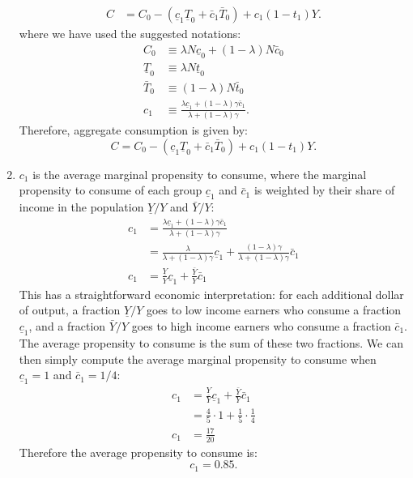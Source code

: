 \documentclass[]{book}
\begin{document}
\begin{enumerate}
\[\begin{aligned}
  C&=C_0 -\left(\underline{c}_{1}\underline{T}_0+\bar{c}_{1}\bar{T}_0\right)+c_1 (1-t_1) Y.
  \end{aligned}
  \] where we have used the suggested notations: \[
  \begin{aligned}
  C_{0}& \equiv \lambda  N \underline{c}_0 + (1-\lambda) N \bar{c}_0\\
  \underline{T}_{0}& \equiv \lambda  N \underline{t}_0\\
  \bar{T}_0 & \equiv (1-\lambda) N \bar{t}_0\\
  c_{1}&\equiv\frac{\lambda\underline{c}_{1}+\left(1-\lambda\right)\gamma\bar{c}_{1}}{\lambda+(1-\lambda)\gamma}.
  \end{aligned}
  \] Therefore, aggregate consumption is given by:
  \[\boxed{C=C_0 -\left(\underline{c}_{1}\underline{T}_0+\bar{c}_{1}\bar{T}_0\right)+c_1 (1-t_1) Y}.\]
\item
  \(c_1\) is the average marginal propensity to consume, where the
  marginal propensity to consume of each group \(\underline{c}_1\) and
  \(\bar{c}_1\) is weighted by their share of income in the population
  \(\underline{Y}/Y\) and \(\bar{Y}/Y\): \[
  \begin{aligned}
  c_1&=\frac{\lambda\underline{c}_{1}+\left(1-\lambda\right)\gamma \bar{c}_{1}}{\lambda+(1-\lambda)\gamma}\\
  &=\frac{\lambda}{\lambda + (1-\lambda)\gamma}\underline{c}_{1} +\frac{(1-\lambda)\gamma}{\lambda+(1-\lambda)\gamma}\bar{c}_{1}\\
  c_1&=\frac{\underline{Y}}{Y}\underline{c}_{1} + \frac{\bar{Y}}{Y}\bar{c}_{1}
  \end{aligned}
  \] This has a straightforward economic interpretation: for each
  additional dollar of output, a fraction \(\underline{Y}/Y\) goes to
  low income earners who consume a fraction \(\underline{c}_1\), and a
  fraction \(\bar{Y}/Y\) goes to high income earners who consume a
  fraction \(\bar{c}_1\). The average propensity to consume is the sum
  of these two fractions. We can then simply compute the average
  marginal propensity to consume when \(\underline{c}_1=1\) and
  \(\bar{c}_1=1/4\): \[
  \begin{aligned}
  c_1 &= \frac{\underline{Y}}{Y}\underline{c}_{1} + \frac{\bar{Y}}{Y}\bar{c}_{1}\\
  &=\frac{4}{5}\cdot 1 + \frac{1}{5}\cdot \frac{1}{4}\\
  c_1 &= \frac{17}{20}
  \end{aligned}
  \] Therefore the average propensity to consume is:
  \[\boxed{c_1 = 0.85}.\]

\end{enumerate}
\end{document}
